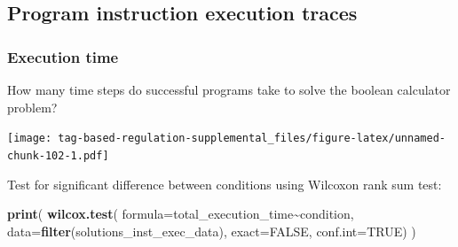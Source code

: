 \documentclass[
]{book}
\newenvironment{Shaded}{\begin{snugshade}}{\end{snugshade}}
\newcommand{\CharTok}[1]{\textcolor[rgb]{0.31,0.60,0.02}{#1}}
\newcommand{\CommentTok}[1]{\textcolor[rgb]{0.56,0.35,0.01}{\textit{#1}}}
\newcommand{\DataTypeTok}[1]{\textcolor[rgb]{0.13,0.29,0.53}{#1}}
\newcommand{\FloatTok}[1]{\textcolor[rgb]{0.00,0.00,0.81}{#1}}
\newcommand{\KeywordTok}[1]{\textcolor[rgb]{0.13,0.29,0.53}{\textbf{#1}}}
\newcommand{\NormalTok}[1]{#1}
\newcommand{\OperatorTok}[1]{\textcolor[rgb]{0.81,0.36,0.00}{\textbf{#1}}}
\newcommand{\OtherTok}[1]{\textcolor[rgb]{0.56,0.35,0.01}{#1}}
\newcommand{\StringTok}[1]{\textcolor[rgb]{0.31,0.60,0.02}{#1}}
\begin{document}
\hypertarget{program-instruction-execution-traces-3}{%
\subsection{Program instruction execution traces}\label{program-instruction-execution-traces-3}}

\hypertarget{execution-time-3}{%
\subsubsection{Execution time}\label{execution-time-3}}

How many time steps do successful programs take to solve the boolean calculator problem?

\begin{Shaded}
\end{Shaded}

\texttt{[image: tag-based-regulation-supplemental\_files/figure-latex/unnamed-chunk-102-1.pdf]}

Test for significant difference between conditions using Wilcoxon rank sum test:

\begin{Shaded}
\begin{Highlighting}[]
\KeywordTok{print}\NormalTok{(}
  \KeywordTok{wilcox.test}\NormalTok{(}
    \DataTypeTok{formula=}\NormalTok{total\_execution\_time}\OperatorTok{\textasciitilde{}}\NormalTok{condition,}
    \DataTypeTok{data=}\KeywordTok{filter}\NormalTok{(solutions\_inst\_exec\_data),}
    \DataTypeTok{exact=}\OtherTok{FALSE}\NormalTok{,}
    \DataTypeTok{conf.int=}\OtherTok{TRUE}\NormalTok{)}
\NormalTok{)}
\end{Highlighting}
\end{Shaded}
\end{document}
